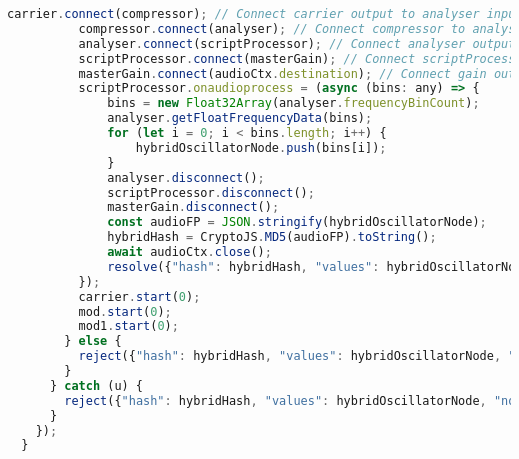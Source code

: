 \begin{lstlisting}[language=JavaScript, caption=Frequency Modulation Hybrid  fingerprint generation code, label=frequencyModualtionHybridFingerprintGenerationCode]
          carrier.connect(compressor); // Connect carrier output to analyser input
          compressor.connect(analyser); // Connect compressor to analyser
          analyser.connect(scriptProcessor); // Connect analyser output to scriptProcessor input
          scriptProcessor.connect(masterGain); // Connect scriptProcessor output to gain input
          masterGain.connect(audioCtx.destination); // Connect gain output to audiocontext destination
          scriptProcessor.onaudioprocess = (async (bins: any) => {
              bins = new Float32Array(analyser.frequencyBinCount);
              analyser.getFloatFrequencyData(bins);
              for (let i = 0; i < bins.length; i++) {
                  hybridOscillatorNode.push(bins[i]);
              }
              analyser.disconnect();
              scriptProcessor.disconnect();
              masterGain.disconnect();
              const audioFP = JSON.stringify(hybridOscillatorNode);
              hybridHash = CryptoJS.MD5(audioFP).toString();
              await audioCtx.close();
              resolve({"hash": hybridHash, "values": hybridOscillatorNode, "noFingerprint": false});
          });
          carrier.start(0);
          mod.start(0);
          mod1.start(0);
        } else {
          reject({"hash": hybridHash, "values": hybridOscillatorNode, "noFingerprint": true});
        }
      } catch (u) {
        reject({"hash": hybridHash, "values": hybridOscillatorNode, "noFingerprint": true});
      }
    });
  }
\end{lstlisting}



